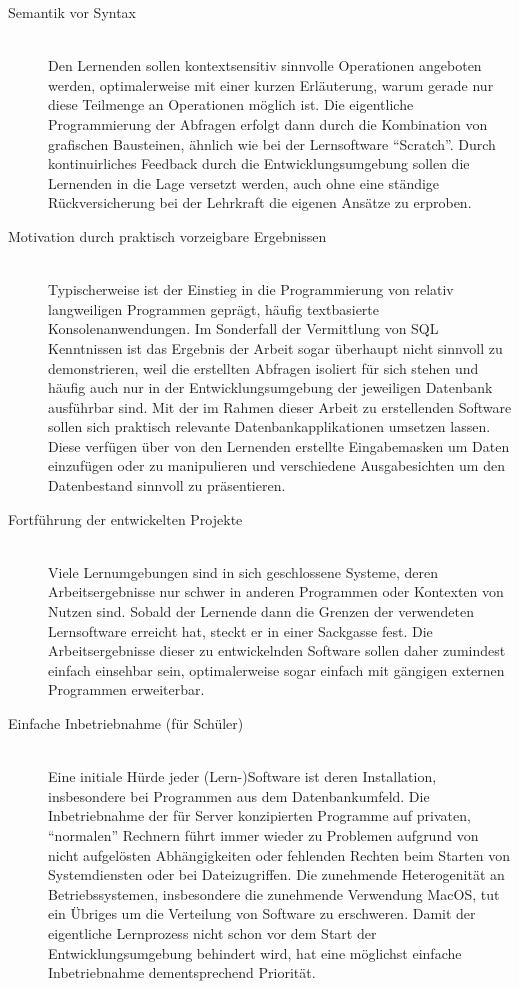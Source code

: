 \documentclass[paper=a4,fontsize=11pt,parskip=half]{scrartcl}
\begin{document}
\begin{description}
\item[Semantik vor Syntax] \hfill\\
  Den Lernenden sollen kontextsensitiv sinnvolle Operationen angeboten werden, optimalerweise mit einer kurzen Erläuterung, warum gerade nur diese Teilmenge an Operationen möglich ist. Die eigentliche Programmierung der Abfragen erfolgt dann durch die Kombination von grafischen Bausteinen, ähnlich wie bei der Lernsoftware ``Scratch''. Durch kontinuirliches Feedback durch die Entwicklungsumgebung sollen die Lernenden in die Lage versetzt werden, auch ohne eine ständige Rückversicherung bei der Lehrkraft die eigenen Ansätze zu erproben.
\item[Motivation durch praktisch vorzeigbare Ergebnissen] \hfill\\
  Typischerweise ist der Einstieg in die Programmierung von relativ langweiligen Programmen geprägt, häufig textbasierte Konsolenanwendungen. Im Sonderfall der Vermittlung von SQL Kenntnissen ist das Ergebnis der Arbeit sogar überhaupt nicht sinnvoll zu demonstrieren, weil die erstellten Abfragen isoliert für sich stehen und häufig auch nur in der Entwicklungsumgebung der jeweiligen Datenbank ausführbar sind. Mit der im Rahmen dieser Arbeit zu erstellenden Software sollen sich praktisch relevante Datenbankapplikationen umsetzen lassen. Diese verfügen über von den Lernenden erstellte Eingabemasken um Daten einzufügen oder zu manipulieren und verschiedene Ausgabesichten um den Datenbestand sinnvoll zu präsentieren.
\item[Fortführung der entwickelten Projekte] \hfill \\
  Viele Lernumgebungen sind in sich geschlossene Systeme, deren Arbeitsergebnisse nur schwer in anderen Programmen oder Kontexten von Nutzen sind. Sobald der Lernende dann die Grenzen der verwendeten Lernsoftware erreicht hat, steckt er in einer Sackgasse fest. Die Arbeitsergebnisse dieser zu entwickelnden Software sollen daher zumindest einfach einsehbar sein, optimalerweise sogar einfach mit gängigen externen Programmen erweiterbar.
\item[Einfache Inbetriebnahme (für Schüler)] \hfill \\
  Eine initiale Hürde jeder (Lern-)Software ist deren Installation, insbesondere bei Programmen aus dem Datenbankumfeld. Die Inbetriebnahme der für Server konzipierten Programme auf privaten, ``normalen'' Rechnern führt immer wieder zu Problemen aufgrund von nicht aufgelösten Abhängigkeiten oder fehlenden Rechten beim Starten von Systemdiensten oder bei Dateizugriffen. Die zunehmende Heterogenität an Betriebssystemen, insbesondere die zunehmende Verwendung MacOS, tut ein Übriges um die Verteilung von Software zu erschweren. Damit der eigentliche Lernprozess nicht schon vor dem Start der Entwicklungsumgebung behindert wird, hat eine möglichst einfache Inbetriebnahme dementsprechend Priorität.

\end{description}
\end{document}
